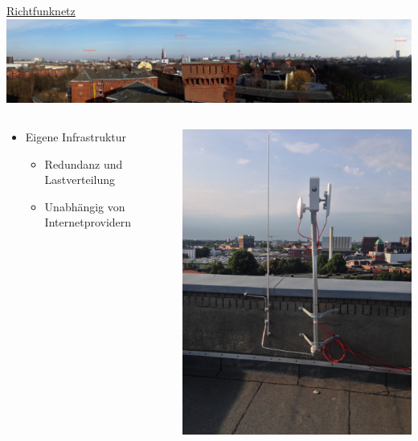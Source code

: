 \documentclass[t]{beamer}
\begin{document}
  \begin{frame}{\href{http://wiki.freifunk.net/Freifunk_Hamburg/Richtfunknetz}{Richtfunknetz}}
    \includegraphics[width=\textwidth]{Bilder/fux}
    \begin{columns}
      \begin{column}{0.7\textwidth}
  \begin{itemize}
    \item Eigene Infrastruktur
    \begin{itemize}
      \item Redundanz und Lastverteilung 
      \item Unabhängig von Internetprovidern
    \end{itemize}
  \end{itemize}
      \end{column}
      \begin{column}{0.3\textwidth}
	\begin{center}
	  \includegraphics[width=.9\textwidth]{Bilder/richtfunkmast}
	\end{center}
      \end{column}
    \end{columns}
  \end{frame}
  
\end{document}
